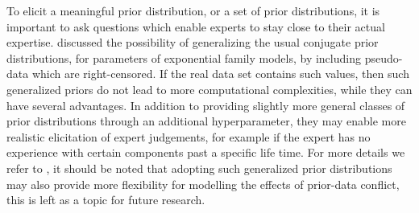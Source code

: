 \documentclass[Journal,letterpaper]{ascelike-new}
\begin{document}
To elicit a meaningful prior distribution, or a set of prior distributions,
it is important to ask questions which enable experts to stay close to their actual expertise.
 discussed the possibility of generalizing the usual conjugate prior distributions,
for parameters of exponential family models, by including pseudo-data which are right-censored.
If the real data set contains such values, then such generalized priors do not lead to more computational complexities,
while they can have several advantages.
In addition to providing slightly more general classes of prior distributions through an additional hyperparameter,
they may enable more realistic elicitation of expert judgements,
for example if the expert has no experience with certain components past a specific life time.
For more details we refer to ,
it should be noted that adopting such generalized prior distributions
may also provide more flexibility for modelling the effects of prior-data conflict,
this is left as a topic for future research.
\end{document}
